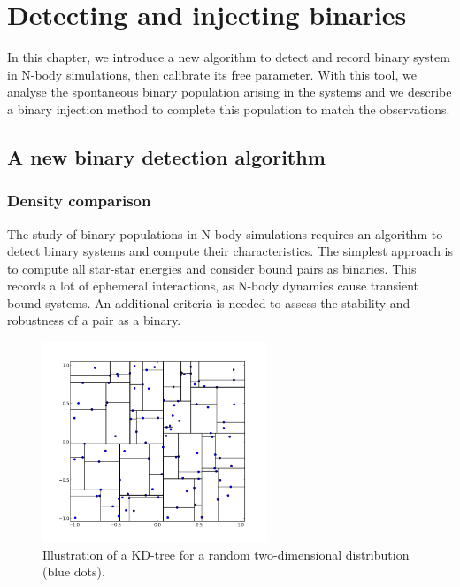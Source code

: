 
\chapter{Detecting and injecting binaries}
\label{Chap:BinAlgo}

In this chapter, we introduce a new algorithm to detect and record binary system in N-body simulations, then calibrate its free parameter. With this tool, we analyse the spontaneous binary population arising in the \HubLem systems and we describe a binary injection method to complete this population to match the observations.


\minitoc

\section{A new binary detection algorithm}


\subsection{Density comparison}

The study of binary populations in N-body simulations requires an algorithm to detect binary systems and compute their characteristics. The simplest approach is to compute all star-star energies and consider bound pairs as binaries. This records a lot of ephemeral interactions, as N-body dynamics cause transient bound systems. An additional criteria is needed to assess the stability and robustness of a pair as a binary.

\begin{figure}
\begin{center}
\includegraphics[width=0.6\textwidth]{Figures/5_kdtree}
\caption{Illustration of a KD-tree for a random two-dimensional distribution (blue dots).}
\label{Fig:5_kdtree}
\end{center}
\end{figure}


